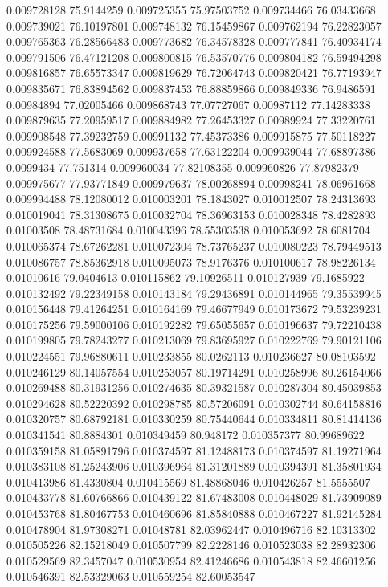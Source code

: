 0.009728128	75.9144259
0.009725355	75.97503752
0.009734466	76.03433668
0.009739021	76.10197801
0.009748132	76.15459867
0.009762194	76.22823057
0.009765363	76.28566483
0.009773682	76.34578328
0.009777841	76.40934174
0.009791506	76.47121208
0.009800815	76.53570776
0.009804182	76.59494298
0.009816857	76.65573347
0.009819629	76.72064743
0.009820421	76.77193947
0.009835671	76.83894562
0.009837453	76.88859866
0.009849336	76.9486591
0.00984894	77.02005466
0.009868743	77.07727067
0.00987112	77.14283338
0.009879635	77.20959517
0.009884982	77.26453327
0.00989924	77.33220761
0.009908548	77.39232759
0.00991132	77.45373386
0.009915875	77.50118227
0.009924588	77.5683069
0.009937658	77.63122204
0.009939044	77.68897386
0.0099434	77.751314
0.009960034	77.82108355
0.009960826	77.87982379
0.009975677	77.93771849
0.009979637	78.00268894
0.00998241	78.06961668
0.009994488	78.12080012
0.010003201	78.1843027
0.010012507	78.24313693
0.010019041	78.31308675
0.010032704	78.36963153
0.010028348	78.4282893
0.01003508	78.48731684
0.010043396	78.55303538
0.010053692	78.6081704
0.010065374	78.67262281
0.010072304	78.73765237
0.010080223	78.79449513
0.010086757	78.85362918
0.010095073	78.9176376
0.010100617	78.98226134
0.01010616	79.0404613
0.010115862	79.10926511
0.010127939	79.1685922
0.010132492	79.22349158
0.010143184	79.29436891
0.010144965	79.35539945
0.010156448	79.41264251
0.010164169	79.46677949
0.010173672	79.53239231
0.010175256	79.59000106
0.010192282	79.65055657
0.010196637	79.72210438
0.010199805	79.78243277
0.010213069	79.83695927
0.010222769	79.90121106
0.010224551	79.96880611
0.010233855	80.0262113
0.010236627	80.08103592
0.010246129	80.14057554
0.010253057	80.19714291
0.010258996	80.26154066
0.010269488	80.31931256
0.010274635	80.39321587
0.010287304	80.45039853
0.010294628	80.52220392
0.010298785	80.57206091
0.010302744	80.64158816
0.010320757	80.68792181
0.010330259	80.75440644
0.010334811	80.81414136
0.010341541	80.8884301
0.010349459	80.948172
0.010357377	80.99689622
0.010359158	81.05891796
0.010374597	81.12488173
0.010374597	81.19271964
0.010383108	81.25243906
0.010396964	81.31201889
0.010394391	81.35801934
0.010413986	81.4330804
0.010415569	81.48868046
0.010426257	81.5555507
0.010433778	81.60766866
0.010439122	81.67483008
0.010448029	81.73909089
0.010453768	81.80467753
0.010460696	81.85840888
0.010467227	81.92145284
0.010478904	81.97308271
0.01048781	82.03962447
0.010496716	82.10313302
0.010505226	82.15218049
0.010507799	82.2228146
0.010523038	82.28932306
0.010529569	82.3457047
0.010530954	82.41246686
0.010543818	82.46601256
0.010546391	82.53329063
0.010559254	82.60053547
